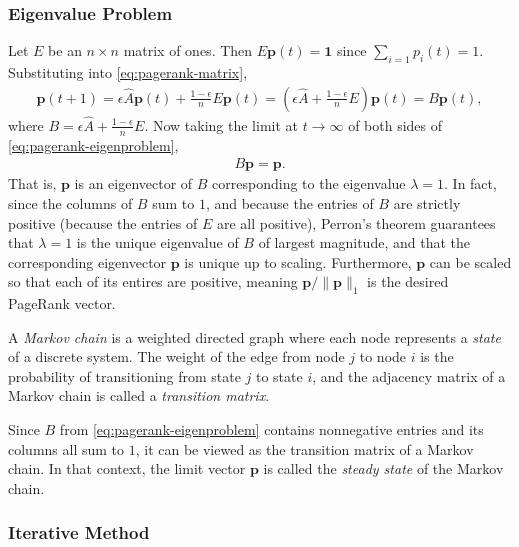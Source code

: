 \subsubsection*{Eigenvalue Problem} %

Let $E$ be an $n \times n$ matrix of ones.
Then $E\mathbf{p}(t) = \mathbf{1}$ since $\sum_{i=1}p_i(t) = 1$.
Substituting into \eqref{eq:pagerank-matrix},
\begin{align}
\mathbf{p}(t+1)
= \epsilon \widehat{A}\mathbf{p}(t) + \frac{1-\epsilon}{n}E\mathbf{p}(t)
= \left(\epsilon \widehat{A} + \frac{1-\epsilon}{n}E\right)\mathbf{p}(t)
= B\mathbf{p}(t),
\label{eq:pagerank-eigenproblem}
\end{align}
where $B = \epsilon \widehat{A} + \frac{1-\epsilon}{n}E$.
Now taking the limit at $t\rightarrow\infty$ of both sides of \eqref{eq:pagerank-eigenproblem},
\begin{align*}
B\mathbf{p} = \mathbf{p}.
\end{align*}
That is, $\mathbf{p}$ is an eigenvector of $B$ corresponding to the eigenvalue $\lambda = 1$.
In fact, since the columns of $B$ sum to $1$, and because the entries of $B$ are strictly positive (because the entries of $E$ are all positive), Perron's theorem guarantees that $\lambda = 1$ is the unique eigenvalue of $B$ of largest magnitude, and that the corresponding eigenvector $\mathbf{p}$ is unique up to scaling.
Furthermore, $\mathbf{p}$ can be scaled so that each of its entires are positive, meaning $\mathbf{p}/\|\mathbf{p}\|_1$ is the desired PageRank vector.

\begin{info} %
A \emph{Markov chain} is a weighted directed graph where each node represents a \emph{state} of a discrete system.
The weight of the edge from node $j$ to node $i$ is the probability of transitioning from state $j$ to state $i$, and the adjacency matrix of a Markov chain is called a \emph{transition matrix}.

Since $B$ from \eqref{eq:pagerank-eigenproblem} contains nonnegative entries and its columns all sum to $1$, it can be viewed as the transition matrix of a Markov chain.
In that context, the limit vector $\mathbf{p}$ is called the \emph{steady state} of the Markov chain.
\end{info}

\subsubsection*{Iterative Method} %

